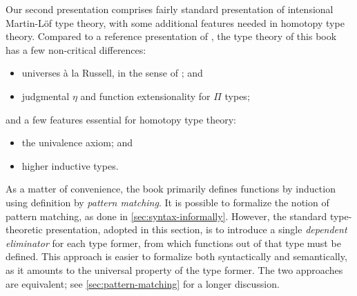 Our second presentation comprises fairly standard presentation of
intensional Martin-L\"{o}f type theory, with some additional features needed in
homotopy type theory. Compared to a reference presentation of
\cite{hofmann:syntax-and-semantics}, the type theory of this book has a few
non-critical differences:
%
\begin{itemize}
\item universes \`{a} la Russell, in the sense of
\cite{martin-lof:bibliopolis}; and
\item judgmental $\eta$ and function extensionality for $\Pi$ types;
\end{itemize}
and a few features essential for homotopy type theory:
\begin{itemize}
\item the univalence axiom; and
\item higher inductive types.
\end{itemize}
%
As a matter of convenience, the book primarily defines functions by induction
using definition by \emph{pattern matching}.
%
%
It is possible to formalize the
notion of pattern matching, as done in \autoref{sec:syntax-informally}. However, the
standard type-theoretic presentation, adopted in this section, is to introduce a single \emph{dependent
eliminator} for each type former, from which functions out of that type must be
defined. This approach is easier to formalize both syntactically and
semantically, as it amounts to the universal property of the type former.
The two approaches are equivalent; see \autoref{sec:pattern-matching} for a
longer discussion.

%


